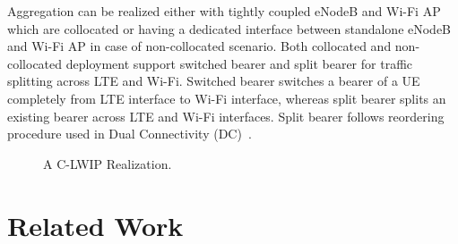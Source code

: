 \documentclass[conference]{IEEEtran}
\begin{document}
Aggregation can be realized either with tightly coupled eNodeB and Wi-Fi AP which are collocated or having a dedicated interface between standalone eNodeB and Wi-Fi AP in case of non-collocated scenario. Both collocated and non-collocated deployment support switched bearer and split bearer for traffic splitting across LTE and Wi-Fi. Switched bearer switches a bearer of a UE completely from LTE interface to Wi-Fi interface, whereas split bearer splits an existing bearer across LTE and Wi-Fi interfaces. Split bearer follows reordering procedure used in Dual Connectivity (DC)~\cite{TS36842}. 

\begin{figure}[t]
\centering
{}
\caption{A C-LWIP Realization.}
\vspace{-0.6cm}
\label{fig:intro}
\end{figure}
\section{Related Work}
\label{sec:litSurvey}
\end{document}
